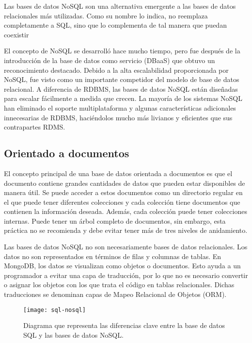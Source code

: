 Las bases de datos NoSQL son una alternativa emergente a las bases de datos relacionales más utilizadas. Como su nombre lo indica, no reemplaza completamente a SQL, sino que lo complementa de tal manera que puedan coexistir 
\vspace{0.8cm}

El concepto de NoSQL se desarrolló hace mucho tiempo, pero fue después de la introducción de la base de datos como servicio (DBaaS) que obtuvo un reconocimiento destacado. Debido a la alta escalabilidad proporcionada por NoSQL, fue visto como un importante competidor del modelo de base de datos relacional. A diferencia de RDBMS, las bases de datos NoSQL están diseñadas para escalar fácilmente a medida que crecen. La mayoría de los sistemas NoSQL han eliminado el soporte multiplataforma y algunas características adicionales innecesarias de RDBMS, haciéndolos mucho más livianos y eficientes que sus contrapartes RDMS.

\subsection{Orientado a documentos}
El concepto principal de una base de datos orientada a documentos es que el documento contiene grandes cantidades de datos que pueden estar disponibles de manera útil. Se puede acceder a estos documentos como un directorio regular en el que puede tener diferentes colecciones y cada colección tiene documentos que contienen la información deseada. Además, cada colección puede tener colecciones internas. Puede tener un árbol completo de documentos, sin embargo, esta práctica no se recomienda y debe evitar tener más de tres niveles de anidamiento. 
\vspace{0.8cm}

Las bases de datos NoSQL no son necesariamente bases de datos relacionales. Los datos no son representados en términos de filas y columnas de tablas. En MongoDB, los datos se visualizan como objetos o documentos. Esto ayuda a un programador a evitar una capa de traducción, por lo que no es necesario convertir o asignar los objetos con los que trata el código en tablas relacionales. Dichas traducciones se denominan capas de Mapeo Relacional de Objetos (ORM).
\begin{figure}[H]
  \centering
  \texttt{[image: sql-nosql]}
  \caption{Diagrama que representa las diferencias clave entre la base de datos SQL y las bases de datos NoSQL.}
\end{figure}